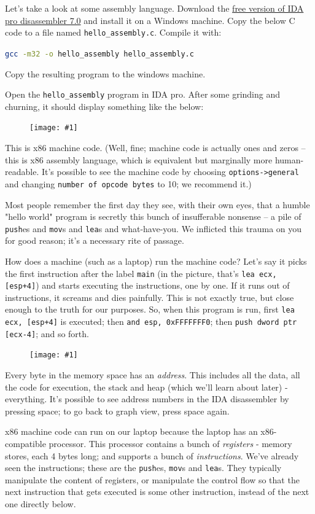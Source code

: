 \documentclass{article}
\newcommand{\displayimage}[1] {
\begin{figure}[H]
    \centering
    \texttt{[image: \#1]} 
\end{figure}
}
\newcommand{\wrapimageleft}[1] {
    \begin{figure}
        \begin{center}
            \texttt{[image: \#1]} 
        \end{center}
    \end{figure}
}
\newcommand{\xcode}[2]{\colorbox{ubuntuback}{\lstinline[language=#1]|#2|}}
\newcommand{\asm}[1]{\xcode{{[x86masm]assembler}}{#1}}
\newcommand{\code}[1]{\colorbox{ubuntuback}{\texttt{#1}}}
\begin{document}
Let's take a look at some assembly language. Download the \href{https://www.hex-rays.com/products/ida/support/download_freeware.shtml}{free version of IDA pro disassembler 7.0} and install it on a Windows machine. Copy the below C code to a file named \code{hello\_assembly.c}. Compile it with:

\xcode{bash}{gcc -m32 -o hello_assembly hello_assembly.c} 

Copy the resulting program to the windows machine.



Open the \code{hello\_assembly} program in IDA pro. After some grinding and churning, it should display something like the below:

\displayimage{./images/hello_assembly_x86.png}

This is x86 machine code. (Well, fine; machine code is actually ones and zeros -- this is x86 assembly language, which is equivalent but marginally more human-readable. It's possible to see the machine code by choosing \code{options->general} and changing \code{number of opcode bytes} to 10; we recommend it.)

Most people remember the first day they see, with their own eyes, that a humble "hello world" program is secretly this bunch of insufferable nonsense -- a pile of \asm{push}es and \asm{mov}s and \asm{lea}s and what-have-you. We inflicted this trauma on you for good reason; it's a necessary rite of passage.

How does a machine (such as a laptop) run the machine code? Let's say it picks the first instruction after the label \asm{main} (in the picture, that's \asm{lea ecx, [esp+4]}) and starts executing the instructions, one by one. If it runs out of instructions, it screams and dies painfully. This is not exactly true, but close enough to the truth for our purposes. So, when this program is run, first \asm{lea ecx, [esp+4]} is executed; then \asm{and esp, 0xFFFFFFF0}; then \asm{push dword ptr [ecx-4]}; and so forth.

\wrapimageleft{./images/process_memory.jpg}
Every byte in the memory space has an \textit{address}. This includes all the data, all the code for execution, the stack and heap (which we'll learn about later) - everything. It's possible to see address numbers in the IDA disassembler by pressing space; to go back to graph view, press space again.

x86 machine code can run on our laptop because the laptop has an x86-compatible processor. This processor contains a bunch of \textit{registers} - memory stores, each 4 bytes long; and supports a bunch of \textit{instructions}. We've already seen the instructions; these are the \asm{push}es, \asm{mov}s and \asm{lea}s. They typically manipulate the content of registers, or manipulate the control flow so that the next instruction that gets executed is some other instruction, instead of the next one directly below.
\end{document}

